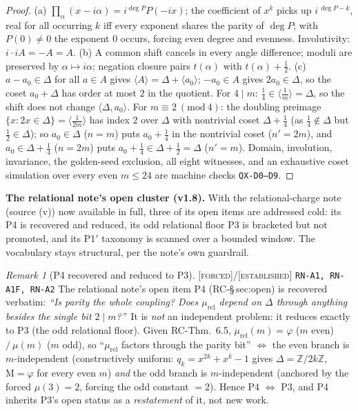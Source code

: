 \documentclass[11pt]{article}
\newcommand{\tagF}{\textcolor{cF}{\textsc{[forced]}}}
\newcommand{\tagE}{\textcolor{cE}{\textsc{[established]}}}
\newcommand{\hx}[1]{\textcolor{cC}{\footnotesize\texttt{#1}}}
\newcommand{\Z}{\mathbb{Z}}
\newcommand{\gp}{\varphi}
\newcommand{\M}{\mathrm{M}}
\theoremstyle{plain}
\theoremstyle{definition}
\theoremstyle{remark}
\newtheorem{remark}[theorem]{Remark}
\begin{document}
\begin{proof}
(a) $\prod_\alpha(x-i\alpha)=i^{\deg P}P(-ix)$; the coefficient of $x^k$
picks up $i^{\,\deg P-k}$, real for all occurring $k$ iff every exponent
shares the parity of $\deg P$; with $P(0)\ne0$ the exponent $0$ occurs,
forcing even degree and evenness. Involutivity: $i\cdot iA=-A=A$. (b) A
common shift cancels in every angle difference; moduli are preserved by
$\alpha\mapsto i\alpha$; negation closure pairs $t(\alpha)$ with
$t(\alpha)+\tfrac12$. (c) $a-a_0\in\Delta$ for all $a\in A$ gives
$\langle A\rangle=\Delta+\langle a_0\rangle$; $-a_0\in A$ gives
$2a_0\in\Delta$, so the coset $a_0+\Delta$ has order at most $2$ in the
quotient. For $4\mid m$: $\tfrac14\in\langle\tfrac1m\rangle=\Delta$, so
the shift does not change $\langle\Delta,a_0\rangle$. For
$m\equiv2\ (\mathrm{mod}\ 4)$: the doubling preimage
$\{x:2x\in\Delta\}=\langle\tfrac1{2m}\rangle$ has index $2$ over $\Delta$
with nontrivial coset $\Delta+\tfrac14$ (as $\tfrac14\notin\Delta$ but
$\tfrac12\in\Delta$); so $a_0\in\Delta$ ($n=m$) puts $a_0+\tfrac14$ in the
nontrivial coset ($n'=2m$), and $a_0\in\Delta+\tfrac14$ ($n=2m$) puts
$a_0+\tfrac14\in\Delta+\tfrac12=\Delta$ ($n'=m$). Domain, involution,
invariance, the golden-seed exclusion, all eight witnesses, and an
exhaustive coset simulation over every even $m\le24$ are machine checks
\hx{QX-D0--D9}.
\end{proof}

\smallskip\noindent
\textbf{The relational note's open cluster (v1.8).} With the
relational-charge note (source (v)) now available in full, three of its open
items are addressed cold: its P4 is recovered and reduced, its odd relational
floor P3 is bracketed but not promoted, and its P1$'$ taxonomy is scanned over
a bounded window. The vocabulary stays structural, per the note's own
guardrail.

\begin{remark}[P4 recovered and reduced to P3]\label{rem:p4recover}\tagF{}/\tagE{} \hx{RN-A1, RN-A1F, RN-A2}
The relational note's open item P4 (RC-\S\,sec:open) is recovered verbatim:
\emph{``Is parity the whole coupling? Does $\mu_{\mathrm{rel}}$ depend on
$\Delta$ through anything besides the single bit $2\mid m$?''}\ It is
\emph{not} an independent problem: it reduces exactly to P3 (the odd relational
floor). Given RC-Thm.~6.5, $\mu_{\mathrm{rel}}(m)=\gp$ ($m$ even) $/\ \mu(m)$
($m$ odd), so ``$\mu_{\mathrm{rel}}$ factors through the parity bit'' $\iff$
the even branch is $m$-independent (constructively uniform: $q_k=x^{2k}+x^k-1$
gives $\Delta=\Z/2k\Z$, $\M=\gp$ for every even $m$) \emph{and} the odd branch
is $m$-independent (anchored by the forced $\mu(3)=2$, forcing the odd constant
$=2$). Hence P4 $\iff$ P3, and P4 inherits P3's open status as a
\emph{restatement} of it, not new work.
\end{remark}
\end{document}
